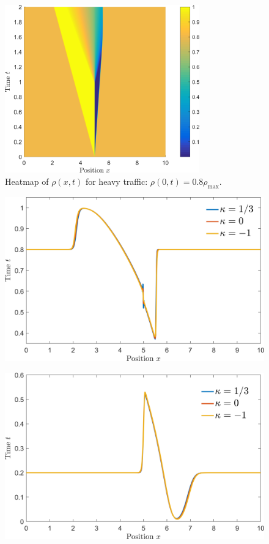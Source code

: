 \documentclass[11pt]{article}
\begin{document}
\begin{figure}[h!]
  \centering
  \includegraphics[width=0.75\textwidth]{1b_heavy_surf.png}
  \caption{Heatmap of $\rho(x,t)$ for heavy traffic: $\rho(0,t) = 0.8\rho_\mathrm{max}$.}
  \label{fig:1b_heavy_surf}
\end{figure}


\begin{figure}[h!]
  \centering
  \includegraphics[width=\textwidth]{2a_heavy.png}
  \caption{}
  \label{fig:2a_heavy}
\end{figure}

\begin{figure}[h!]
  \centering
  \includegraphics[width=\textwidth]{2a_light.png}
  \caption{}
  \label{fig:2a_light}
\end{figure}
\end{document}
